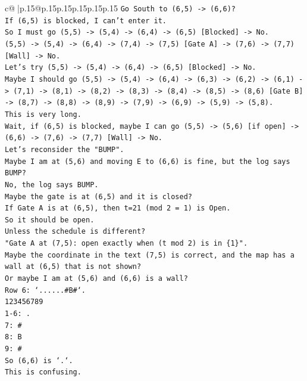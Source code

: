 \documentclass{article}
\begin{document}
{\begin{supertabular}{c@{$\;$}|p{.15\linewidth}@{}p{.15\linewidth}p{.15\linewidth}p{.15\linewidth}p{.15\linewidth}p{.15\linewidth}}
{{{\texttt{Go South to (6,5) {-}> (6,6)?} \\
\texttt{If (6,5) is blocked, I can't enter it.} \\
\texttt{So I must go (5,5) {-}> (5,4) {-}> (6,4) {-}> (6,5) {[}Blocked{]} {-}> No.} \\
\texttt{(5,5) {-}> (5,4) {-}> (6,4) {-}> (7,4) {-}> (7,5) {[}Gate A{]} {-}> (7,6) {-}> (7,7) {[}Wall{]} {-}> No.} \\
\texttt{Let's try (5,5) {-}> (5,4) {-}> (6,4) {-}> (6,5) {[}Blocked{]} {-}> No.} \\
\texttt{Maybe I should go (5,5) {-}> (5,4) {-}> (6,4) {-}> (6,3) {-}> (6,2) {-}> (6,1) {-}> (7,1) {-}> (8,1) {-}> (8,2) {-}> (8,3) {-}> (8,4) {-}> (8,5) {-}> (8,6) {[}Gate B{]} {-}> (8,7) {-}> (8,8) {-}> (8,9) {-}> (7,9) {-}> (6,9) {-}> (5,9) {-}> (5,8).} \\
\texttt{This is very long.} \\
\texttt{Wait, if (6,5) is blocked, maybe I can go (5,5) {-}> (5,6) {[}if open{]} {-}> (6,6) {-}> (7,6) {-}> (7,7) {[}Wall{]} {-}> No.} \\
\texttt{Let's reconsider the "BUMP".} \\
\texttt{Maybe I am at (5,6) and moving E to (6,6) is fine, but the log says BUMP?} \\
\texttt{No, the log says BUMP.} \\
\texttt{Maybe the gate is at (6,5) and it is closed?} \\
\texttt{If Gate A is at (6,5), then t=21 (mod 2 = 1) is Open.} \\
\texttt{So it should be open.} \\
\texttt{Unless the schedule is different?} \\
\texttt{"Gate A at (7,5): open exactly when (t mod 2) is in \{1\}".} \\
\texttt{Maybe the coordinate in the text (7,5) is correct, and the map has a wall at (6,5) that is not shown?} \\
\texttt{Or maybe I am at (5,6) and (6,6) is a wall?} \\
\texttt{Row 6: `......\#B\#`.} \\
\texttt{123456789} \\
\texttt{1{-}6: .} \\
\texttt{7: \#} \\
\texttt{8: B} \\
\texttt{9: \#} \\
\texttt{So (6,6) is `.`.} \\
\texttt{This is confusing.} \\
}}}
\end{supertabular}}
\end{document}
